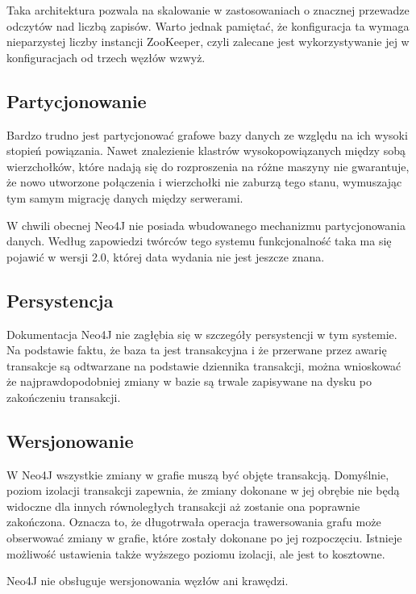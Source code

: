 Taka architektura pozwala na skalowanie w zastosowaniach o znacznej przewadze odczytów nad liczbą zapisów.
Warto jednak pamiętać, że konfiguracja ta wymaga nieparzystej liczby instancji ZooKeeper, czyli zalecane jest wykorzystywanie jej w konfiguracjach od trzech węzłów wzwyż.

\subsection*{Partycjonowanie}

Bardzo trudno jest partycjonować grafowe bazy danych ze względu na ich wysoki stopień powiązania.
Nawet znalezienie klastrów wysokopowiązanych między sobą wierzchołków, które nadają się do rozproszenia na różne maszyny nie gwarantuje, że nowo utworzone połączenia i wierzchołki nie zaburzą tego stanu, wymuszając tym samym migrację danych między serwerami.

W chwili obecnej Neo4J nie posiada wbudowanego mechanizmu partycjonowania danych.
Według zapowiedzi twórców tego systemu funkcjonalność taka ma się pojawić w wersji 2.0, której data wydania nie jest jeszcze znana.

\subsection*{Persystencja}

Dokumentacja Neo4J nie zagłębia się w szczegóły persystencji w tym systemie.
Na podstawie faktu, że baza ta jest transakcyjna i że przerwane przez awarię transakcje są odtwarzane na podstawie dziennika transakcji, można wnioskować że najprawdopodobniej zmiany w bazie są trwale zapisywane na dysku po zakończeniu transakcji.

\subsection*{Wersjonowanie}

W Neo4J wszystkie zmiany w grafie muszą być objęte transakcją.
Domyślnie, poziom izolacji transakcji zapewnia, że zmiany dokonane w jej obrębie nie będą widoczne dla innych równoległych transakcji aż zostanie ona poprawnie zakończona.
Oznacza to, że długotrwała operacja trawersowania grafu może obserwować zmiany w grafie, które zostały dokonane po jej rozpoczęciu.
Istnieje możliwość ustawienia także wyższego poziomu izolacji, ale jest to kosztowne.

Neo4J nie obsługuje wersjonowania węzłów ani krawędzi.

